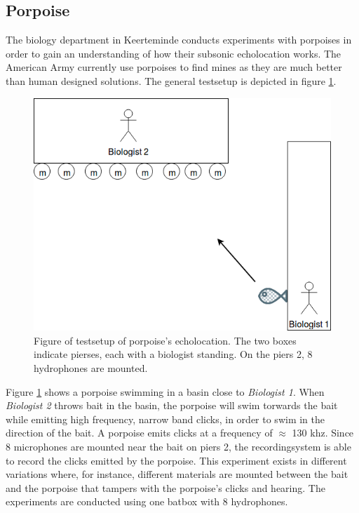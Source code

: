 \subsection{Porpoise}
The biology department in Keerteminde conducts experiments with porpoises in order to gain an understanding of how their subsonic echolocation works. The American Army currently use porpoises to find mines as they are much better than human designed solutions. The general testsetup is depicted in figure \ref{usecase:porpoise_experiment1}.
\begin{figure}[!h]
    \centering
	\includegraphics[width=\textwidth]{figures/porpoise_experiment1}
	\caption{Figure of testsetup of porpoise's echolocation. The two boxes indicate pierses, each with a biologist standing. On the piers 2, 8 hydrophones are mounted.}\label{usecase:porpoise_experiment1}
\end{figure}


Figure \ref{usecase:porpoise_experiment1} shows a porpoise swimming in a basin close to \textit{Biologist 1}.
When \textit{Biologist 2} throws bait in the basin, the porpoise will swim torwards the bait while emitting high frequency, narrow band clicks, in order to swim in the direction of the bait. A porpoise emits clicks at a frequency of $\approx$ 130 khz.
Since 8 microphones are mounted near the bait on piers 2, the recordingsystem is able to record the clicks emitted by the porpoise. This experiment exists in different variations where, for instance, different materials are mounted between the bait and the porpoise that tampers with the porpoise's clicks and hearing. The experiments are conducted using one batbox with 8 hydrophones.

